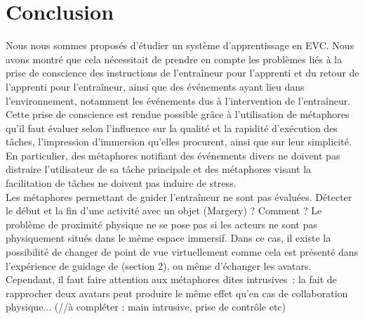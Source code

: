 \documentclass[11pt]{article}
\begin{document}
\begin{comment}
For the first type of actions, The same metaphors than for the collaboration tasks can be used. For the second type, four metaphors can be evaluated:
\begin{enumerate}
	\item The coach avatar casts a spell using a specific gesture and voice control. Such a multimodal command can be real, i.e the coach has to perform it in order to make a parameter change, or just a metaphor, i.e the coach doesn't perform it but his avatar moves and speaks automatically.
	\item A 3D animation is performed by the system. For example, a grey cloud can appear and move through the scene in order to indicate that the weather is now rainy.
	\item A popup indicating the change is displayed.
	\item No indication at all.
\end{enumerate}

Several perception aspects can be evaluated thanks to these tests: the annoyance and pleasant degrees and the execution time (some metaphors can capture the attention of the trainee for a quite long time).
\end{comment}

\section{Conclusion}

Nous nous sommes proposés d'étudier un système d'apprentissage en EVC. Nous avons montré que cela nécessitait de prendre en compte les problèmes liés à la prise de conscience des instructions de l'entraîneur pour l'apprenti et du retour de l'apprenti pour l'entraîneur, ainsi que des événements ayant lieu dans l'environnement, notamment les événements dus à l'intervention de l'entraîneur. Cette prise de conscience est rendue possible grâce à l'utilisation de métaphores qu'il faut évaluer selon l'influence sur la qualité et la rapidité d'exécution des tâches, l'impression d'immersion qu'elles procurent, ainsi que sur leur simplicité. En particulier, des métaphores notifiant des événements divers ne doivent pas distraire l'utilisateur de sa tâche principale et des métaphores visant la facilitation de tâches ne doivent pas induire de stress.
\\

Les métaphores permettant de guider l'entraîneur ne sont pas évaluées.
Détecter le début et la fin d'une activité avec un objet (Margery) ? Comment ?
Le problème de proximité physique ne se pose pas si les acteurs ne sont pas physiquement situés dans le même espace immersif. Dans ce cas, il existe la possibilité de changer de point de vue virtuellement comme cela est présenté dans l'expérience de guidage de \cite{thesis} (section 2), ou même d'échanger les avatars. Cependant, il faut faire attention aux métaphores dites intrusives~: la fait de rapprocher deux avatars peut produire le même effet qu'en cas de collaboration physique... (//à compléter : main intrusive, prise de contrôle etc)
\end{document}

